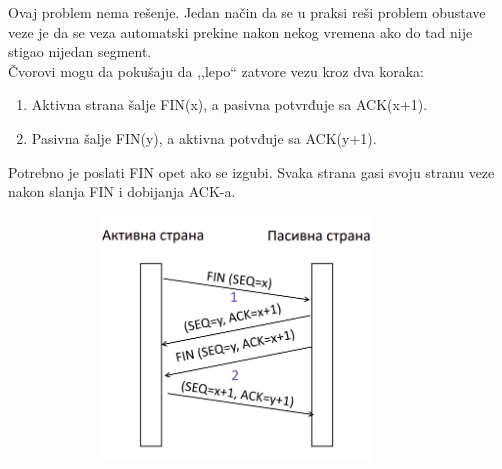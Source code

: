 \documentclass[a4paper]{article}
\begin{document}
        Ovaj problem nema rešenje. Jedan način da se u praksi reši problem obustave veze je 
        da se veza automatski prekine nakon nekog vremena ako do tad nije stigao nijedan segment.\\

        \noindent Čvorovi mogu da pokušaju da ,,lepo`` zatvore vezu kroz dva koraka:
        \begin{enumerate}
            \item Aktivna strana šalje FIN(x), a pasivna potvrđuje sa ACK(x+1).
            \item Pasivna šalje FIN(y), a aktivna potvđuje sa ACK(y+1).
        \end{enumerate}
        Potrebno je poslati FIN opet ako se izgubi. Svaka strana gasi svoju stranu veze nakon slanja
        FIN i dobijanja ACK-a.
        \begin{figure}[H]
            \begin{center}
                \includegraphics[width=100mm,height=65mm]{Slike/obustava_veze.png}
            \end{center}
        \end{figure}
\end{document}
